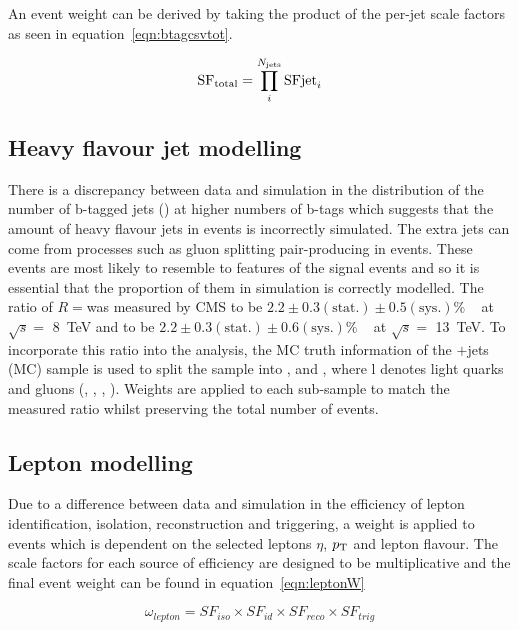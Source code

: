 An event weight can be derived by taking the product of the per-jet scale factors as seen in equation~\ref{eqn:btagcsvtot}.

\begin{equation}
\textrm{SF}_{\textrm{total}} = \prod_{i}^{N_{\textrm{jets}}}\textrm{SFjet}_{i}
\label{eqn:btagcsvtot}
\end{equation}

\subsection{Heavy flavour jet modelling}
There is a discrepancy between data and simulation in the distribution of the number of b-tagged jets (\nbtags) at higher numbers of b-tags which suggests that the amount of heavy flavour jets in \ttbar events is incorrectly simulated. The extra jets can come from processes such as gluon splitting pair-producing \bbbar in \ttbar events. These \ttbb events are most likely to resemble to features of the \tttt signal events and so it is essential that the proportion of them in simulation is correctly modelled.
The ratio of $R=$\heavyflavour was measured by CMS to be $2.2 \pm 0.3 \left( \textrm{stat.} \right) \pm 0.5 \left(\textrm{sys.} \right)\% $ ~\cite{Khachatryan2015132} at $\sqrt{s} =$ 8~TeV and to be $2.2 \pm 0.3 \left( \textrm{stat.} \right) \pm 0.6 \left(\textrm{sys.} \right)\% $ ~\cite{CMS-PAS-TOP-16-010} at $\sqrt{s} =$ 13~TeV. To incorporate this ratio into the analysis, the MC truth information of the \ttbar$+$jets (MC) sample is used to split the sample into \ttbb, \ttcc and \ttll, where l denotes light quarks and gluons (\cPqu, \cPqd, \cPqs, \cPg). Weights are applied to each sub-sample to match the measured ratio whilst preserving the total number of \ttbar events.

\subsection{Lepton modelling}
Due to a difference between data and simulation in the efficiency of lepton identification, isolation, reconstruction and triggering, a weight is applied to events which is dependent on the selected leptons $\eta$, $p_{\mathrm{T}}$ and lepton flavour. The scale factors for each source of efficiency are designed to be multiplicative and the final event weight can be found in equation~\ref{eqn:leptonW}

\begin{equation}
\omega_{lepton} = SF_{iso}\times SF_{id}\times SF_{reco}\times SF_{trig}
\label{eqn:leptonW}
\end{equation}

